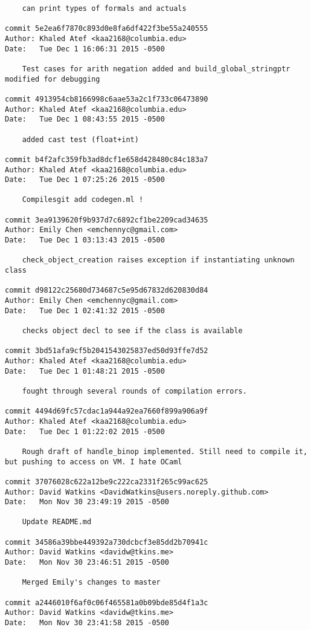 \begin{verbatim}
    can print types of formals and actuals

commit 5e2ea6f7870c893d0e8fa6df422f3be55a240555
Author: Khaled Atef <kaa2168@columbia.edu>
Date:   Tue Dec 1 16:06:31 2015 -0500

    Test cases for arith negation added and build_global_stringptr modified for debugging

commit 4913954cb8166998c6aae53a2c1f733c06473890
Author: Khaled Atef <kaa2168@columbia.edu>
Date:   Tue Dec 1 08:43:55 2015 -0500

    added cast test (float+int)

commit b4f2afc359fb3ad8dcf1e658d428480c84c183a7
Author: Khaled Atef <kaa2168@columbia.edu>
Date:   Tue Dec 1 07:25:26 2015 -0500

    Compilesgit add codegen.ml !

commit 3ea9139620f9b937d7c6892cf1be2209cad34635
Author: Emily Chen <emchennyc@gmail.com>
Date:   Tue Dec 1 03:13:43 2015 -0500

    check_object_creation raises exception if instantiating unknown class

commit d98122c25680d734687c5e95d67832d620830d84
Author: Emily Chen <emchennyc@gmail.com>
Date:   Tue Dec 1 02:41:32 2015 -0500

    checks object decl to see if the class is available

commit 3bd51afa9cf5b2041543025837ed50d93ffe7d52
Author: Khaled Atef <kaa2168@columbia.edu>
Date:   Tue Dec 1 01:48:21 2015 -0500

    fought through several rounds of compilation errors.

commit 4494d69fc57cdac1a944a92ea7660f899a906a9f
Author: Khaled Atef <kaa2168@columbia.edu>
Date:   Tue Dec 1 01:22:02 2015 -0500

    Rough draft of handle_binop implemented. Still need to compile it, but pushing to access on VM. I hate OCaml

commit 37076028c622a12be9c222ca2331f265c99ac625
Author: David Watkins <DavidWatkins@users.noreply.github.com>
Date:   Mon Nov 30 23:49:19 2015 -0500

    Update README.md

commit 34586a39bbe449392a730dcbcf3e85dd2b70941c
Author: David Watkins <davidw@tkins.me>
Date:   Mon Nov 30 23:46:51 2015 -0500

    Merged Emily's changes to master

commit a2446010f6af0c06f465581a0b09bde85d4f1a3c
Author: David Watkins <davidw@tkins.me>
Date:   Mon Nov 30 23:41:58 2015 -0500


\end{verbatim}
